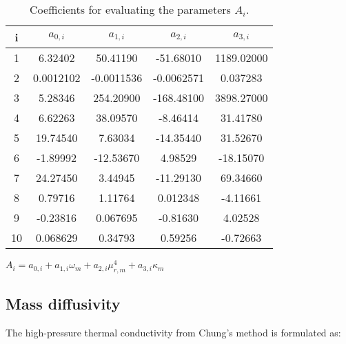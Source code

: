 \begin{table}
	\centering
	\caption{Coefficients for evaluating the parameters $A_i$.}\label{Ai_table}
	\begin{threeparttable}
		\begin{tabular*}{0.8\textwidth}{c|cccc}
			\toprule
			i     & $a_{0,i}$        & $a_{1,i}$         & $a_{2,i}$       & $a_{3,i}$   \\
			\midrule
			1     & 6.32402          & 50.41190          & -51.68010       & 1189.02000  \\
			2     & 0.0012102        & -0.0011536        & -0.0062571      & 0.037283    \\
			3     & 5.28346          & 254.20900         & -168.48100      & 3898.27000  \\
			4     & 6.62263          & 38.09570          & -8.46414        & 31.41780    \\
			5     & 19.74540         & 7.63034           & -14.35440       & 31.52670    \\
			6     & -1.89992         & -12.53670         & 4.98529         & -18.15070   \\
			7     & 24.27450         & 3.44945           & -11.29130       & 69.34660    \\
			8     & 0.79716          & 1.11764           & 0.012348        & -4.11661    \\
			9     & -0.23816         & 0.067695          & -0.81630        & 4.02528     \\
			10    & 0.068629         & 0.34793           & 0.59256         & -0.72663    \\
			\bottomrule
		\end{tabular*}
		\begin{tablenotes}
			\footnotesize
			\item $A_{i} = a_{0,i} + a_{1,i}\omega_m + a_{2,i} \mu_{r,m}^4 + a_{3,i} \kappa_m$\\
		\end{tablenotes}
	\end{threeparttable}
\end{table}

\subsection{Mass diffusivity}
The high-pressure thermal conductivity from Chung's method \cite{chung1988generalized} is formulated as:

